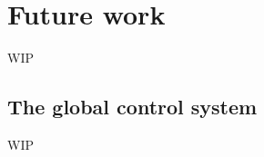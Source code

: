 \section{Future work}
\label{sec:future}
\begin{colsection}


\begin{colsection}

WIP
\citep{GW150914, GW150914_followup, GW151226}

\end{colsection}


\subsection{The global control system}
\label{sec:gtecs_multisite}
\begin{colsection}

WIP

\end{colsection}


\end{colsection}

